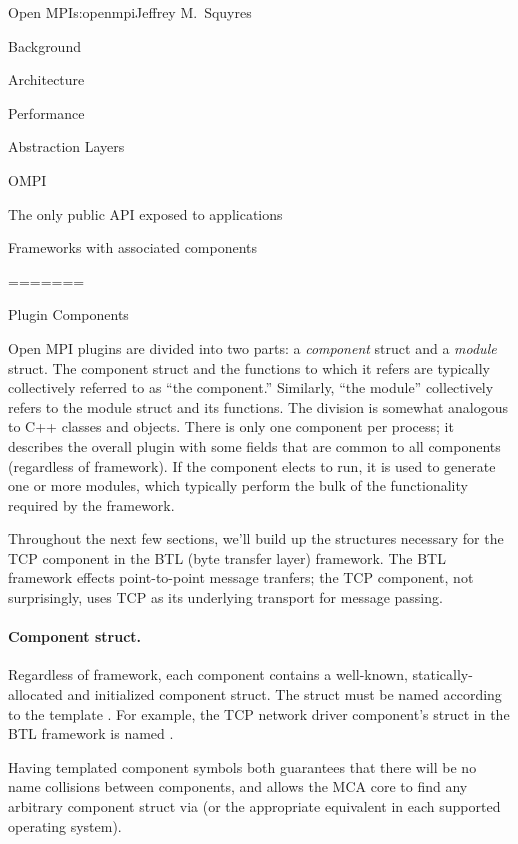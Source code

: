 \begin{aosachapter}{Open MPI}{s:openmpi}{Jeffrey M.\ Squyres}
\begin{aosasect1}{Background}
\begin{aosasect1}{Architecture}
\begin{aosasect2}{Performance}
\begin{aosasect2}{Abstraction Layers}
\begin{aosaitemize}
\item OMPI
  \begin{aosaitemize}
  \item The only public API exposed to applications
  \item Frameworks with associated components
  \end{aosaitemize}
\end{aosaitemize}

=======
\begin{aosasect2}{Plugin Components}

Open MPI plugins are divided into two parts: a \emph{component}
struct and a \emph{module} struct.
%
The component struct and the functions to which it refers are
typically collectively referred to as ``the component.''  Similarly,
``the module'' collectively refers to the module struct and its
functions.
%
The division is somewhat analogous to C++ classes and objects.
%
There is only one component per process; it describes the overall
plugin with some fields that are common to all components (regardless
of framework).
%
If the component elects to run, it is used to generate one or more
modules, which typically perform the bulk of the functionality
required by the framework.

Throughout the next few sections, we'll build up the structures
necessary for the TCP component in the BTL (byte transfer layer)
framework.  The BTL framework effects point-to-point message tranfers;
the TCP component, not surprisingly, uses TCP as its underlying
transport for message passing.


\paragraph{Component struct.} 

Regardless of framework, each component contains a well-known,
statically-allocated and initialized component struct.  
%
The struct must be named according to the template 
.  For example, the
TCP network driver component's struct in the BTL framework is named
.

Having templated component symbols both guarantees that there will be
no name collisions between components, and allows the MCA core to find
any arbitrary component struct via  (or the appropriate
equivalent in each supported operating system).


\end{aosasect2}
\end{aosasect2}
\end{aosasect2}
\end{aosasect1}
\end{aosasect1}
\end{aosachapter}

